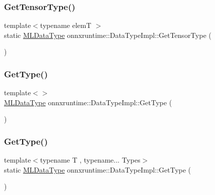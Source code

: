 \mbox{\label{classonnxruntime_1_1DataTypeImpl_a7c4a6a7126bc7661eb67af6dfcfad1fb}} 
\subsubsection{\texorpdfstring{Get\+Tensor\+Type()}{GetTensorType()}}
{\footnotesize\ttfamily template$<$typename elemT $>$ \\
static \mbox{\hyperlink{namespaceonnxruntime_ad77d0a6e838ec7da5dc35fed5ee66b49}{M\+L\+Data\+Type}} onnxruntime\+::\+Data\+Type\+Impl\+::\+Get\+Tensor\+Type (\begin{DoxyParamCaption}{ }\end{DoxyParamCaption})\hspace{0.3cm}{\ttfamily [static]}}

\mbox{\label{classonnxruntime_1_1DataTypeImpl_a6114f59e1f36431080497ce7873585e4}} 
\subsubsection{\texorpdfstring{Get\+Type()}{GetType()}\hspace{0.1cm}{\footnotesize\ttfamily [1/2]}}
{\footnotesize\ttfamily template$<$$>$ \\
\mbox{\hyperlink{namespaceonnxruntime_ad77d0a6e838ec7da5dc35fed5ee66b49}{M\+L\+Data\+Type}} onnxruntime\+::\+Data\+Type\+Impl\+::\+Get\+Type (\begin{DoxyParamCaption}{ }\end{DoxyParamCaption})}

\mbox{\label{classonnxruntime_1_1DataTypeImpl_a4a10af95a06b1d04aba64fd7e8c2a8d6}} 
\subsubsection{\texorpdfstring{Get\+Type()}{GetType()}\hspace{0.1cm}{\footnotesize\ttfamily [2/2]}}
{\footnotesize\ttfamily template$<$typename T , typename... Types$>$ \\
static \mbox{\hyperlink{namespaceonnxruntime_ad77d0a6e838ec7da5dc35fed5ee66b49}{M\+L\+Data\+Type}} onnxruntime\+::\+Data\+Type\+Impl\+::\+Get\+Type (\begin{DoxyParamCaption}{ }\end{DoxyParamCaption})\hspace{0.3cm}{\ttfamily [static]}}

